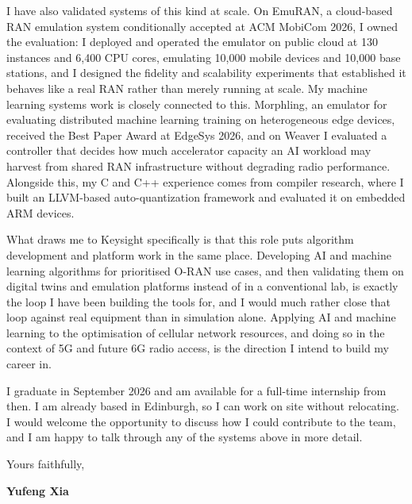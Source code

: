 \documentclass[letterpaper,11pt]{article}
\begin{document}
I have also validated systems of this kind at scale. On EmuRAN, a cloud-based
RAN emulation system conditionally accepted at ACM MobiCom 2026, I owned the
evaluation: I deployed and operated the emulator on public cloud at 130 instances
and 6,400 CPU cores, emulating 10,000 mobile devices and 10,000 base stations,
and I designed the fidelity and scalability experiments that established it
behaves like a real RAN rather than merely running at scale. My machine learning
systems work is closely connected to this. Morphling, an emulator for evaluating
distributed machine learning training on heterogeneous edge devices, received the
Best Paper Award at EdgeSys 2026, and on Weaver I evaluated a controller that
decides how much accelerator capacity an AI workload may harvest from shared RAN
infrastructure without degrading radio performance. Alongside this, my C and C++
experience comes from compiler research, where I built an LLVM-based
auto-quantization framework and evaluated it on embedded ARM devices.

What draws me to Keysight specifically is that this role puts algorithm
development and platform work in the same place. Developing AI and machine
learning algorithms for prioritised O-RAN use cases, and then validating them on
digital twins and emulation platforms instead of in a conventional lab, is
exactly the loop I have been building the tools for, and I would much rather
close that loop against real equipment than in simulation alone. Applying AI and
machine learning to the optimisation of cellular network resources, and doing so
in the context of 5G and future 6G radio access, is the direction I intend to
build my career in.

I graduate in September 2026 and am available for a full-time internship from
then. I am already based in Edinburgh, so I can work on site without relocating.
I would welcome the opportunity to discuss how I could contribute to the team,
and I am happy to talk through any of the systems above in more detail.

\vspace{10pt}

Yours faithfully,

\vspace{14pt}

\textbf{Yufeng Xia}
\end{document}
